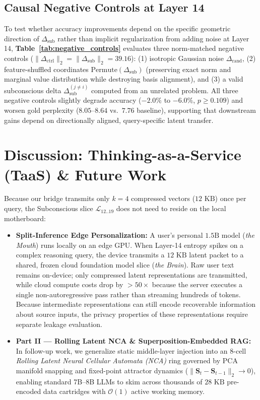 \documentclass[10pt,twocolumn]{article}
\begin{document}
\subsection{Causal Negative Controls at Layer 14}
\label{sec:negative_controls}
To test whether accuracy improvements depend on the specific geometric direction of $\Delta_{\text{sub}}$ rather than implicit regularization from adding noise at Layer 14, \textbf{Table~\ref{tab:negative_controls}} evaluates three norm-matched negative controls ($\|\Delta_{\text{ctrl}}\|_2 = \|\Delta_{\text{sub}}\|_2 = 39.16$): (1) isotropic Gaussian noise $\Delta_{\text{rand}}$, (2) feature-shuffled coordinates $\text{Permute}(\Delta_{\text{sub}})$ (preserving exact norm and marginal value distribution while destroying basis alignment), and (3) a valid subconscious delta $\Delta_{\text{sub}}^{(j \neq i)}$ computed from an unrelated problem. All three negative controls slightly degrade accuracy ($-2.0\%$ to $-6.0\%$, $p \ge 0.109$) and worsen gold perplexity ($8.05\text{--}8.64$ vs.\ $7.76$ baseline), supporting that downstream gains depend on directionally aligned, query-specific latent transfer.

\section{Discussion: Thinking-as-a-Service (TaaS) \& Future Work}
Because our bridge transmits only $k=4$ compressed vectors ($12\text{ KB}$) once per query, the Subconscious slice $\mathcal{L}_{12..19}$ does not need to reside on the local motherboard:
\begin{itemize}
    \item \textbf{Split-Inference Edge Personalization:} A user's personal $1.5\text{B}$ model (\emph{the Mouth}) runs locally on an edge GPU. When Layer-14 entropy spikes on a complex reasoning query, the device transmits a $12\text{ KB}$ latent packet to a shared, frozen cloud foundation model slice (\emph{the Brain}). Raw user text remains on-device; only compressed latent representations are transmitted, while cloud compute costs drop by $>50\times$ because the server executes a single non-autoregressive pass rather than streaming hundreds of tokens. Because intermediate representations can still encode recoverable information about source inputs, the privacy properties of these representations require separate leakage evaluation.
    \item \textbf{Part II --- Rolling Latent NCA \& Superposition-Embedded RAG:} In follow-up work, we generalize static middle-layer injection into an 8-cell \emph{Rolling Latent Neural Cellular Automata (NCA)} ring governed by PCA manifold snapping and fixed-point attractor dynamics ($\|\mathbf{S}_t - \mathbf{S}_{t-1}\|_2 \to 0$), enabling standard 7B--8B LLMs to skim across thousands of $28\text{ KB}$ pre-encoded data cartridges with $\mathcal{O}(1)$ active working memory.
\end{itemize}
\end{document}
